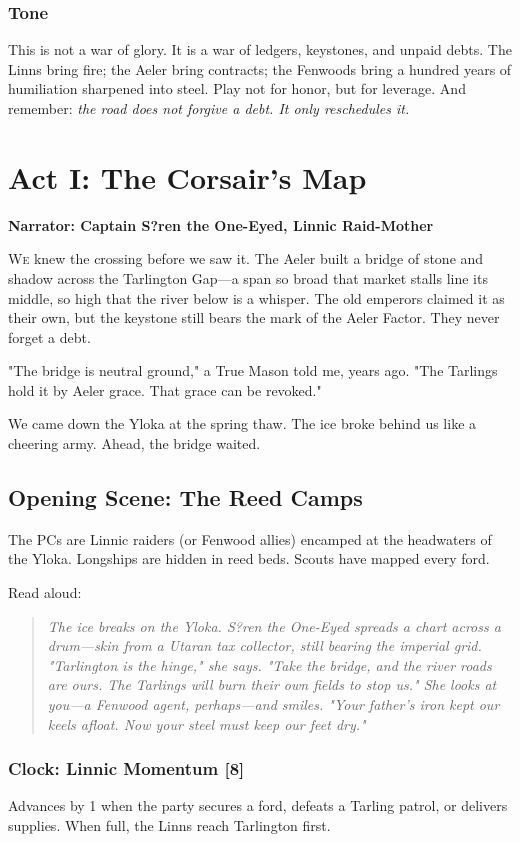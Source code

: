 \documentclass[11pt]{book}
\begin{document}
\subsection*{Tone}
This is not a war of glory. It is a war of ledgers, keystones, and unpaid debts. The Linns bring fire; the Aeler bring contracts; the Fenwoods bring a hundred years of humiliation sharpened into steel. Play not for honor, but for leverage. And remember: \textit{the road does not forgive a debt. It only reschedules it.}

\clearpage

\chapter{Act I: The Corsair's Map}
\textbf{Narrator: Captain S?ren the One-Eyed, Linnic Raid-Mother}

\lettrine{W}{e} knew the crossing before we saw it. The Aeler built a bridge of stone and shadow across the Tarlington Gap---a span so broad that market stalls line its middle, so high that the river below is a whisper. The old emperors claimed it as their own, but the keystone still bears the mark of the Aeler Factor. They never forget a debt.

"The bridge is neutral ground," a True Mason told me, years ago. "The Tarlings hold it by Aeler grace. That grace can be revoked."

We came down the Yloka at the spring thaw. The ice broke behind us like a cheering army. Ahead, the bridge waited.

\section*{Opening Scene: The Reed Camps}
The PCs are Linnic raiders (or Fenwood allies) encamped at the headwaters of the Yloka. Longships are hidden in reed beds. Scouts have mapped every ford.

Read aloud:
\begin{quote}
\emph{The ice breaks on the Yloka. S?ren the One-Eyed spreads a chart across a drum---skin from a Utaran tax collector, still bearing the imperial grid. "Tarlington is the hinge," she says. "Take the bridge, and the river roads are ours. The Tarlings will burn their own fields to stop us." She looks at you---a Fenwood agent, perhaps---and smiles. "Your father's iron kept our keels afloat. Now your steel must keep our feet dry."}
\end{quote}

\subsection*{Clock: Linnic Momentum [8]}
Advances by 1 when the party secures a ford, defeats a Tarling patrol, or delivers supplies. When full, the Linns reach Tarlington first.
\end{document}
